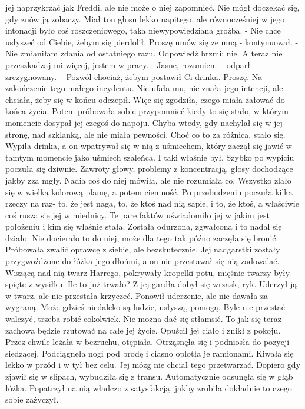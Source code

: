 \documentclass[12pt,a4paper]{book}
\begin{document}
jej naprzykrzać jak Freddi, ale nie może o niej zapomnieć. Nie mógł doczekać się, gdy znów ją zobaczy. Miał ton głosu lekko napitego, ale równocześniej w jego intonacji było coś roszczeniowego, taka niewypowiedziana groźba. 
- Nie chcę usłyszeć od Ciebie, żebym się pierdolił. Proszę umów się ze mną - kontynuował. 
- Nie zmianiłam zdania od ostatniego razu. Odpowiedź brzmi: nie. A teraz nie przeszkadzaj mi więcej, jestem w pracy. 
- Jasne, rozumiem – odparł zrezygnowany. – Pozwól chociaż, żebym postawił Ci drinka. Proszę. Na zakończenie tego małego incydentu. 
Nie ufała mu, nie znała jego intencji, ale chciała, żeby się w końcu odczepił. Więc się zgodziła, czego miała żałować do końca życia. Potem próbowała sobie przypomnieć kiedy to się stało, w którym momencie dosypał jej czegoś do napoju. Chyba wtedy, gdy nachylał się w jej stronę, nad szklanką, ale nie miała pewności. Choć co to za
różnica, stało się. Wypiła drinka, a on wpatrywał się w nią z uśmiechem, który zaczął się jawić w tamtym momencie jako uśmiech szaleńca. I taki właśnie był. Szybko po wypiciu poczuła się dziwnie. Zawroty głowy, problemy z koncentracją, głosy dochodzące jakby zza mgły. Nadia coś do niej mówiła, ale nie rozumiała co. Wszystko zlało się w wielką kolorową plamę, a potem ciemność. 
Po przebudzeniu poczuła kilka rzeczy na raz- to, że jest naga, to, że ktoś nad nią sapie, i to, że ktoś, a właściwie coś rusza się jej w miednicy. Te pare faktów uświadomiło jej w jakim jest położeniu i kim się właśnie stała. Została odurzona, zgwałcona i to nadal się działo. Nie docierało to do niej, może dla tego tak późno zaczęła się bronić. Próbowała zwalić oprawcę z siebie, ale bezskutecznie. Jej nadgarstki zostały przygwoźdżone do łóżka jego dłońmi, a on nie przestawał się nią zadowalać. Wiszącą nad nią twarz Harrego, pokrywały kropelki potu, mięśnie twarzy były spięte z wysiłku. Ile to już trwało? Z jej
gardła dobył się wrzask, ryk. Uderzył ją w twarz, ale nie przestała krzyczeć. Ponowił uderzenie, ale nie dawała za wygraną. Może gdzieś niedaleko są ludzie, usłyszą, pomogą. Byle nie przestać walczyć, trzeba robić cokolwiek. Nie można dać się stłamsić. To jak się teraz zachowa będzie rzutować na całe jej życie. 
Opuścił jej ciało i znikł z pokoju. Przez chwile leżała w bezruchu, otępiała. Otrząsnęła się i podniosła do pozycji siedzącej. Podciągnęła nogi pod brodę i ciasno oplotła je ramionami. Kiwała się lekko w przód i w tył bez celu. Jej mózg nie chciał tego przetwarzać. Dopiero gdy zjawił się w slipach, wybudziła się z transu. Automatycznie odsunęła się w głąb łóżka. Popatrzył na nią władczo z satysfakcją, jakby zrobiła dokładnie to czego sobie zażyczył. 
\end{document}
